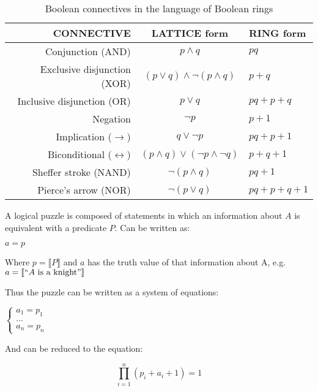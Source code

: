 \begin{table}[h!]
\centering
\begin{tabular}{ rcl } 
 \hline
 CONNECTIVE & LATTICE form & RING form \\ 
 \hline
 Conjunction (AND) & $p \land q$ & $pq$ \\ 
 Exclusive disjunction (XOR) & $(p \lor q) \land \neg(p \land q)$ & $p + q$ \\  
 Inclusive disjunction (OR) & $p \lor q$ & $pq + p + q$ \\ 
 Negation & $\neg p$ & $p + 1$ \\ 
 Implication ($\rightarrow$) & $q \lor \neg p $ & $pq + p + 1$ \\  
 Biconditional ($\leftrightarrow$) & $(p \land q) \lor (\neg p \land \neg q)$ & $p + q + 1$ \\   
 Sheffer stroke (NAND) & $\neg (p \land q)$ & $pq + 1$ \\ 
 Pierce’s arrow (NOR) & $\neg (p \lor q)$ & $pq + p + q + 1$ \\ 
 \hline
\end{tabular}
\caption{Boolean connectives in the language of Boolean rings \cite{Ciraulo2020algebra}}
\label{table:boolean_connectives}
\end{table}

A logical puzzle is composed of statements in which an information about $A$ is equivalent with a predicate $P$. Can be written as:

\begin{center}
\begin{math}
a = p
\end{math}
\end{center}

Where $p = \llbracket P \rrbracket$ and $a$ has the truth value of that information about A, e.g. $a = \llbracket ``A \textrm{ is a knight}" \rrbracket$ 

Thus the puzzle can be written as a system of equations:

\begin{center}
\begin{math}
\begin{cases}
 a_1 = p_1\\
 \dots\\
 a_n = p_n
\end{cases}
\end{math} 
\end{center}

And can be reduced to the equation:

\begin{equation}
\prod_{i=1}^{n} (p_i + a_i + 1) = 1
\label{eq:one_eq}
\end{equation}

